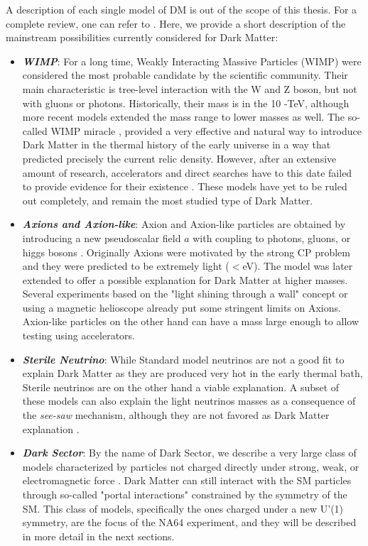 A description of each single model of DM is out of the scope of this thesis. For a complete review, one can refer to \cite{battaglieri2017cosmic,Profumo:2019ujg,HAMBYE2020135553,alex2016dark,review-particle-physics,Feng:2010gw}. Here, we provide a short description of the mainstream possibilities currently considered for Dark Matter:
\begin{itemize}
\item \textbf{\textit{WIMP}}: For a long time, Weakly Interacting Massive Particles (WIMP) were considered the most probable candidate by the scientific community. Their main characteristic is tree-level interaction with the W and Z boson, but not with gluons or photons. Historically, their mass is in the 10 \gev-\si{\tera\electronvolt}, although more recent models extended the mass range to lower masses as well. The so-called WIMP miracle \cite{Chang:2013oia}, provided a very effective and natural way to introduce Dark Matter in the thermal history of the early universe in a way that predicted precisely the current relic density. However, after an extensive amount of research, accelerators and direct searches have to this date failed to provide evidence for their existence \cite{Arcadi:2017kky}. These models have yet to be ruled out completely, and remain the most studied type of Dark Matter.
\item \textbf{\textit{Axions and Axion-like}}: Axion and Axion-like particles are obtained by introducing a new pseudoscalar field $a$ with coupling to photons, gluons, or higgs bosons \cite{Marsh:2015xka}. Originally Axions were motivated by the strong CP problem and they were predicted to be extremely light ($<$\si{\electronvolt}). The model was later extended to offer a possible explanation for Dark Matter at higher masses. Several experiments based on the "light shining through a wall" concept or using a magnetic helioscope \cite{annurev.nucl.56.080805.140513} already put some stringent limits on Axions. Axion-like particles on the other hand can have a mass large enough to allow testing using accelerators.
\item \textbf{\textit{Sterile Neutrino}}: While Standard model neutrinos are not a good fit to explain Dark Matter as they are produced very hot in the early thermal bath, Sterile neutrinos are on the other hand a viable explanation. A subset of these models can also explain the light neutrinos masses as a consequence of the \textit{see-saw} mechanism, although they are not favored as Dark Matter explanation \cite{Feng:2010gw}. 
\item \textbf{\textit{Dark Sector}}: By the name of Dark Sector, we describe a very large class of models characterized by particles not charged directly under strong, weak, or electromagnetic force \cite{alex2016dark}. Dark Matter can still interact with the SM particles through so-called "portal interactions" constrained by the symmetry of the SM. This class of models, specifically the ones charged under a new U'(1) symmetry, are the focus of the NA64 experiment, and they will be described in more detail in the next sections.
\end{itemize}

